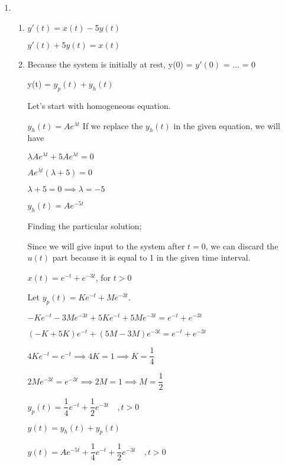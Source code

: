 \documentclass[10pt,a4paper, margin=1in]{article}
\begin{document}
\begin{enumerate}
\begin{enumerate}
    \end{enumerate}


\item %
    \begin{enumerate}
    \item %
    
    $y'(t) = x(t) - 5y(t)$
        
    $y'(t) + 5y(t) = x(t)$
    
    \item %
    Because the system is initially at rest, y(0) = $y'(0)$ = ... = 0
    
    y(t) = $y_p(t)+y_h(t)$
    \vspace{0.25cm}
    
    Let's start with homogeneous equation.
    
    $y_h(t)=Ae^{\lambda t}$
    If we replace the $y_h(t)$ in the given equation, we will have
    
    $\lambda Ae^{\lambda t}+5Ae^{\lambda t}=0$
    
    $Ae^{\lambda t}(\lambda+5)=0$
    
    $\lambda+5=0\implies \lambda=-5$
    
    $y_h(t)=Ae^{-5t}$
    \vspace{0.25cm}
    
    Finding the particular solution;
    
    Since we will give input to the system after $t=0$, we can discard the $u(t)$ part because it is equal to 1 in the given time interval.
    
    $x(t)=e^{-t}+e^{-3t}$, for $t>0$
    
    
    Let $y_p(t) = Ke^{-t} + Me^{-3t}$.
    
    $-Ke^{-t}-3Me^{-3t}+5Ke^{-t}+5Me^{-3t} = e^{-t} + e^{-3t}$ 
    
    $(-K+5K)e^{-t} + (5M-3M)e^{-3t} = e^{-t} + e^{-3t}$
    
    $4Ke^{-t} = e^{-t} \implies 4K=1 \implies K = \dfrac{1}{4} $
    
    $2Me^{-3t}= e^{-3t} \implies 2M=1 \implies M = \dfrac{1}{2}$
    
    $y_p(t) = \dfrac{1}{4}e^{-t} + \dfrac{1}{2}e^{-3t}\quad, t>0$
    
    $y(t) = y_h(t) + y_p(t)$
    
    $y(t) = Ae^{-5t} + \dfrac{1}{4}e^{-t} + \dfrac{1}{2}e^{-3t} \quad, t>0$
    

\end{enumerate}
\end{enumerate}
\end{document}
